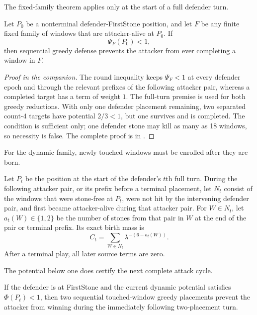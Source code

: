 The fixed-family theorem applies only at the start of a full defender turn.

\begin{theorem}
\label{thm:ES-T1}
Let $P_0$ be a nonterminal defender-\textup{FirstStone} position, and let $F$
be any finite fixed family of windows that are attacker-alive at $P_0$.  If
\[
  \Psi_F(P_0)<1,
\]
then sequential greedy defense prevents the attacker from ever completing a
window in $F$.
\end{theorem}

\begin{proof}[Proof in the companion]
The round inequality keeps $\Psi_F<1$ at every defender epoch and through the
relevant prefixes of the following attacker pair, whereas a completed target
has a term of weight $1$.  The full-turn premise is used for both greedy
reductions.  With only one defender placement remaining, two separated
count-$4$ targets have potential $2/3<1$, but one survives and is completed.
The condition is sufficient only; one defender stone may kill as many as 18
windows, so necessity is false.  The complete proof is in
\cite{hexobot-companions}.
\end{proof}

For the dynamic family, newly touched windows must be enrolled after they are
born.

\begin{definition}
\label{def:ES-D5}
Let $P_t$ be the position at the start of the defender's $t$th full turn.
During the following attacker pair, or its prefix before a terminal placement,
let $N_t$ consist of the windows that were stone-free at $P_t$, were not hit by
the intervening defender pair, and first became attacker-alive during that
attacker pair.  For $W\in N_t$, let $a_t(W)\in\{1,2\}$ be the number of stones
from that pair in $W$ at the end of the pair or terminal prefix.  Its exact
birth mass is
\[
  C_t=\sum_{W\in N_t}\lambda^{-(6-a_t(W))}.
\]
After a terminal play, all later source terms are zero.
\end{definition}

The potential below one does certify the next complete attack cycle.

\begin{theorem}
\label{thm:ES-T2}
If the defender is at \textup{FirstStone} and the current dynamic potential
satisfies $\Phi(P_t)<1$, then two sequential touched-window greedy placements
prevent the attacker from winning during the immediately following
two-placement turn.
\end{theorem}

